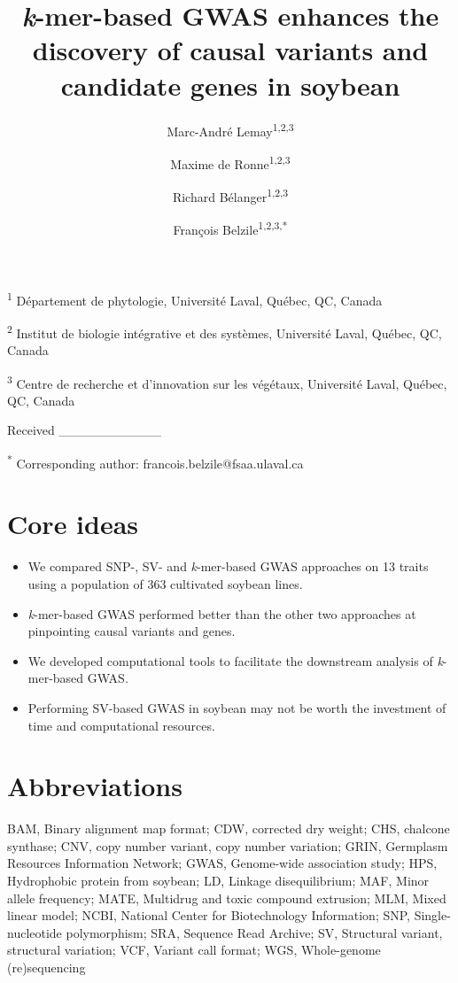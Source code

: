 \documentclass{article}
\title{\textit{k}-mer-based GWAS enhances the discovery of causal variants and candidate genes in soybean}
\date{}
\author{Marc-André Lemay\textsuperscript{1,2,3} \and
Maxime de Ronne\textsuperscript{1,2,3} \and
Richard Bélanger\textsuperscript{1,2,3} \and
François Belzile\textsuperscript{1,2,3,*}}
\begin{document}
\maketitle

\textsuperscript{1} Département de phytologie, Université Laval, Québec, QC, Canada

\textsuperscript{2} Institut de biologie intégrative et des systèmes, Université Laval, Québec, QC, Canada

\textsuperscript{3} Centre de recherche et d’innovation sur les végétaux, Université Laval, Québec, QC, Canada

Received \_\_\_\_\_\_\_\_\_\_\_

\textsuperscript{*} Corresponding author: francois.belzile@fsaa.ulaval.ca

\clearpage

\section*{Core ideas}

\begin{itemize}
	\item We compared SNP-, SV- and \textit{k}-mer-based GWAS approaches
		on 13 traits using a population of 363 cultivated soybean lines.
	\item \textit{k}-mer-based GWAS performed better than the other two approaches
		at pinpointing causal variants and genes.
	\item We developed computational tools to facilitate the downstream analysis
		of \textit{k}-mer-based GWAS.
	\item Performing SV-based GWAS in soybean may not be worth the investment
		of time and computational resources.
\end{itemize}

\section*{Abbreviations}
BAM, Binary alignment map format;
CDW, corrected dry weight;
CHS, chalcone synthase;
CNV, copy number variant, copy number variation;
GRIN, Germplasm Resources Information Network;
GWAS, Genome-wide association study;
HPS, Hydrophobic protein from soybean;
LD, Linkage disequilibrium;
MAF, Minor allele frequency;
MATE, Multidrug and toxic compound extrusion;
MLM, Mixed linear model;
NCBI, National Center for Biotechnology Information;
SNP, Single-nucleotide polymorphism;
SRA, Sequence Read Archive;
SV, Structural variant, structural variation;
VCF, Variant call format;
WGS, Whole-genome (re)sequencing
\end{document}

